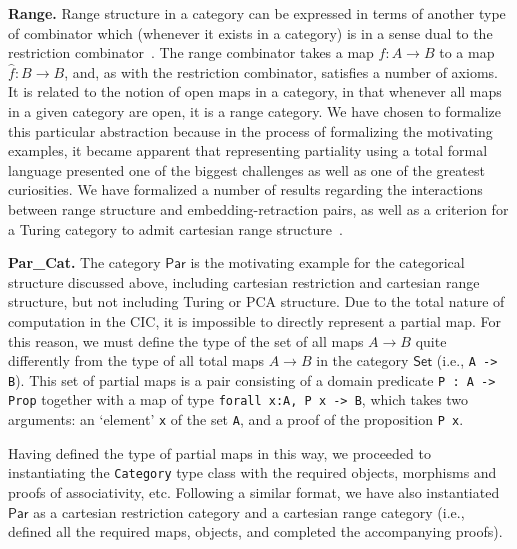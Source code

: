 \documentclass{entcs} \usepackage{entcsmacro}
\begin{document}
{\bfseries Range.} Range structure in a category can be expressed in terms of another type of combinator which (whenever it exists in a category) is in a sense dual to the restriction combinator~\cite{RangeI}. The range combinator takes a map $f : A \to B$ to a map $\hat{f} : B \to B$, and, as with the restriction combinator, satisfies a number of axioms. It is related to the notion of open maps in a category, in that whenever all maps in a given category are open, it is a range category. We have chosen to formalize this particular abstraction because in the process of formalizing the motivating examples, %
it became apparent that representing partiality using a total formal language presented one of the biggest challenges as well as one of the greatest curiosities. We have formalized a number of results regarding the interactions between range structure and embedding-retraction pairs, as well as a criterion for a Turing category to admit cartesian range structure~\cite{MyThesis}.

{\bfseries Par\_Cat.} The category $\mathsf{Par}$ is the motivating example for the categorical structure discussed above, including cartesian restriction and cartesian range structure, but not including Turing or PCA structure. Due to the total nature of computation in the CIC, it is impossible to directly represent a partial map. For this reason, we must define the type of the set of all maps $A \to B$ quite differently from the type of all total maps $A \to B$ in the category $\mathsf{Set}$ (i.e., {\tt A -> B}). This set of partial maps is a pair consisting of a domain predicate {\tt P : A -> Prop} together with a map of type {\tt forall x:A, P x -> B}, which takes two arguments: an `element' {\tt x} of the set {\tt A}, and a proof of the proposition {\tt P x}. 

Having defined the type of partial maps in this way, we proceeded to instantiating the {\tt Category} type class with the required objects, morphisms and proofs of associativity, etc. Following a similar format, we have also instantiated $\mathsf{Par}$ as a cartesian restriction category and a cartesian range category (i.e., defined all the required maps, objects, and completed the accompanying proofs).

\end{document}
